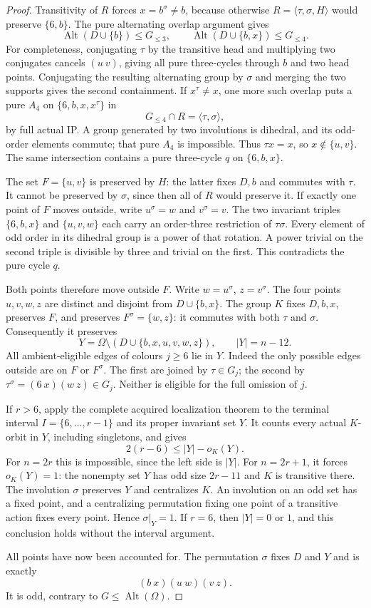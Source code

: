 \documentclass[11pt,a4paper]{article}
\newcommand{\gen}[1]{\langle#1\rangle}
\newcommand{\Alt}{\operatorname{Alt}}
\begin{document}
\begin{proof}
Transitivity of $R$ forces $x=b^\sigma\ne b$, because
otherwise $R=\gen{\tau,\sigma,H}$ would preserve
$\{6,b\}$. The pure alternating overlap argument gives
\[
 \Alt(D\cup\{b\})\le G_{\le3},\qquad
 \Alt(D\cup\{b,x\})\le G_{\le4}.
\]
For completeness, conjugating $\tau$ by the transitive head
and multiplying two conjugates cancels $(u\ v)$, giving
all pure three-cycles through $b$ and two head points.
Conjugating the resulting alternating group by $\sigma$
and merging the two supports gives the second containment.
If $x^\tau\ne x$, one more such overlap puts a pure
$A_4$ on $\{6,b,x,x^\tau\}$ in
\[
                   G_{\le4}\cap R=\gen{\tau,\sigma},
\]
by full actual IP. A group generated by two involutions is
dihedral, and its odd-order elements commute; that pure
$A_4$ is impossible. Thus $\tau x=x$, so
$x\notin\{u,v\}$. The same intersection contains a
pure three-cycle $q$ on $\{6,b,x\}$.

The set $F=\{u,v\}$ is preserved by $H$: the latter fixes
$D,b$ and commutes with $\tau$. It cannot be preserved by
$\sigma$, since then all of $R$ would preserve it. If exactly
one point of $F$ moves outside, write $u^\sigma=w$ and
$v^\sigma=v$. The two invariant triples $\{6,b,x\}$
and $\{u,v,w\}$ each carry an order-three restriction of
$\tau\sigma$. Every element of odd order in its dihedral
group is a power of that rotation. A power trivial on the
second triple is divisible by three and trivial on the first.
This contradicts the pure cycle $q$.

Both points therefore move outside $F$. Write
$w=u^\sigma$, $z=v^\sigma$. The four points $u,v,w,z$
are distinct and disjoint from $D\cup\{b,x\}$.
The group $K$ fixes $D,b,x$, preserves $F$, and preserves
$F^\sigma=\{w,z\}$: it commutes with both $\tau$
and $\sigma$. Consequently it preserves
\[
 Y=\Omega\setminus(D\cup\{b,x,u,v,w,z\}),
                     \qquad |Y|=n-12.
\]
All ambient-eligible edges of colours $j\ge6$ lie in $Y$.
Indeed the only possible edges outside are on $F$ or
$F^\sigma$. The first are joined by $\tau\in G_j$;
the second by $\tau^\sigma=(6\ x)(w\ z)\in G_j$.
Neither is eligible for the full omission of $j$.

If $r>6$, apply the complete acquired localization theorem
to the terminal interval $I=\{6,\ldots,r-1\}$ and its
proper invariant set $Y$. It counts every actual $K$-orbit
in $Y$, including singletons, and gives
\[
                  2(r-6)\le |Y|-o_K(Y).
\]
For $n=2r$ this is impossible, since the left side is $|Y|$.
For $n=2r+1$, it forces $o_K(Y)=1$: the nonempty set $Y$
has odd size $2r-11$ and $K$ is transitive there.
The involution $\sigma$ preserves $Y$ and centralizes $K$.
An involution on an odd set has a fixed point, and a
centralizing permutation fixing one point of a transitive
action fixes every point. Hence $\sigma|_Y=1$.
If $r=6$, then $|Y|=0$ or $1$, and this conclusion holds
without the interval argument.

All points have now been accounted for. The permutation
$\sigma$ fixes $D$ and $Y$ and is exactly
\[
                         (b\ x)(u\ w)(v\ z).
\]
It is odd, contrary to $G\le\Alt(\Omega)$.
\end{proof}
\end{document}
